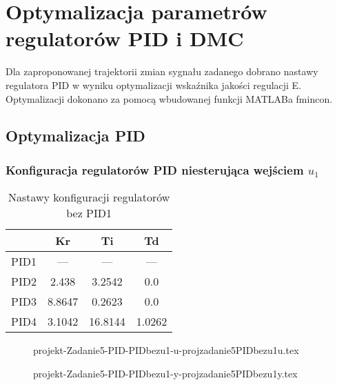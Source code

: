 \section{Optymalizacja parametrów regulatorów PID i DMC}
\label{projekt:zad5}


Dla zaproponowanej trajektorii zmian sygnału zadanego dobrano nastawy
regulatora PID w wyniku optymalizacji wskaźnika jakości regulacji E.
Optymalizacji dokonano za pomocą wbudowanej funkcji MATLABa fmincon.

\subsection{Optymalizacja PID}

\subsubsection{Konfiguracja regulatorów PID niesterująca wejściem $u_{1}$}

\begin{table}[H]
    \centering
    \begin{tabular}{|l|c|c|c|}
    \hline
         & Kr  & Ti  & Td  \\ \hline
    PID1 & --- & --- & --- \\ \hline
    PID2 & 2.438 & 3.2542 & 0.0 \\ \hline
    PID3 & 8.8647 & 0.2623 & 0.0 \\ \hline
    PID4 & 3.1042 & 16.8144 & 1.0262 \\ \hline
    \end{tabular}
    \caption[H]{Nastawy konfiguracji regulatorów bez PID1}
\end{table}


\ifdefined\CompileFigures
\begin{figure}[H] 
    \centering
    
    \caption{projekt-Zadanie5-PID-PIDbezu1-u-projzadanie5PIDbezu1u.tex}
    \label{projekt:zad5:figure:projzadanie5PIDbezu1u}
\end{figure}
\fi

\ifdefined\CompileFigures
\begin{figure}[H] 
    \centering
    
    \caption{projekt-Zadanie5-PID-PIDbezu1-y-projzadanie5PIDbezu1y.tex}
    \label{projekt:zad5:figure:projzadanie5PIDbezu1y}
\end{figure}
\fi

